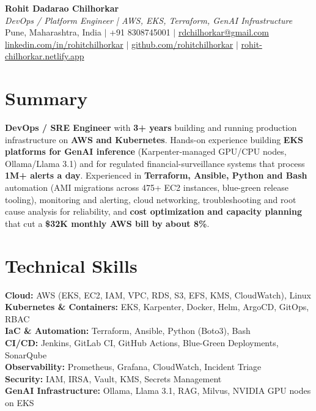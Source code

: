 \documentclass[letterpaper,11pt]{article}
\begin{document}
\begin{center}
    {\fontsize{21}{24}\selectfont\textbf{Rohit Dadarao Chilhorkar}} \\[1pt]
    {\fontsize{11}{13}\selectfont
    \textit{DevOps / Platform Engineer | AWS, EKS, Terraform, GenAI Infrastructure}} \\[2pt]
    \small
    Pune, Maharashtra, India $|$
    +91 8308745001 $|$
    \href{mailto:rdchilhorkar@gmail.com}{rdchilhorkar@gmail.com} \\
    \href{https://linkedin.com/in/rohitchilhorkar}{linkedin.com/in/rohitchilhorkar} $|$
    \href{https://github.com/rohitchilhorkar}{github.com/rohitchilhorkar} $|$
    \href{https://rohit-chilhorkar.netlify.app/}{rohit-chilhorkar.netlify.app}
\end{center}

\section{Summary}
\small{
\textbf{DevOps / SRE Engineer} with \textbf{3+ years} building and running production infrastructure on \textbf{AWS and Kubernetes}. Hands-on experience building \textbf{EKS platforms for GenAI inference} (Karpenter-managed GPU/CPU nodes, Ollama/Llama 3.1) and for regulated financial-surveillance systems that process \textbf{1M+ alerts a day}. Experienced in \textbf{Terraform, Ansible, Python and Bash} automation (AMI migrations across 475+ EC2 instances, blue-green release tooling), monitoring and alerting, cloud networking, troubleshooting and root cause analysis for reliability, and \textbf{cost optimization and capacity planning} that cut a \textbf{\$32K monthly AWS bill by about 8\%}.
}

\section{Technical Skills}
\begin{itemize}[leftmargin=0.15in, label={}]
\small{\item{
    \textbf{Cloud:} AWS (EKS, EC2, IAM, VPC, RDS, S3, EFS, KMS, CloudWatch), Linux \\
    \textbf{Kubernetes \& Containers:} EKS, Karpenter, Docker, Helm, ArgoCD, GitOps, RBAC \\
    \textbf{IaC \& Automation:} Terraform, Ansible, Python (Boto3), Bash \\
    \textbf{CI/CD:} Jenkins, GitLab CI, GitHub Actions, Blue-Green Deployments, SonarQube \\
    \textbf{Observability:} Prometheus, Grafana, CloudWatch, Incident Triage \\
    \textbf{Security:} IAM, IRSA, Vault, KMS, Secrets Management \\
    \textbf{GenAI Infrastructure:} Ollama, Llama 3.1, RAG, Milvus, NVIDIA GPU nodes on EKS
}}
\end{itemize}
\end{document}
